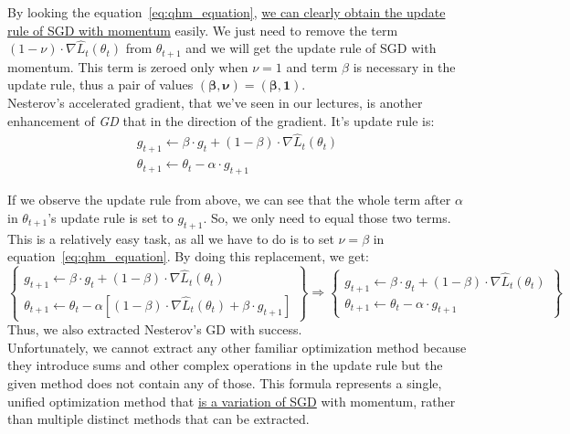 By looking the equation~\ref{eq:qhm_equation}, \underline{we can clearly obtain the update rule of SGD with momentum} easily. We just need to remove the term $\left(1 -\nu \right) \cdot \nabla \hat{L}_{t}\left(\theta_{t}\right)$ from $\theta_{t+1}$ and we will get the update rule of SGD with momentum.
This term is zeroed only when $\nu = 1$ and term $\beta$ is necessary in the update rule, thus a pair of values $\mathbf{\left(\beta, \nu\right) = \left(\beta, 1\right)}$.\\

Nesterov's accelerated gradient, that we've seen in our lectures, is another enhancement of \textit{GD} that  in the direction of the gradient. It's update rule is:
\[
\begin{array}{l}
	g_{t+1} \leftarrow \beta \cdot g_t + \left(1 - \beta \right) \cdot \nabla \hat{L}_t \left(\theta_t\right) \\ 
	\theta_{t+1} \leftarrow \theta_{t} - \alpha \cdot g_{t+1}
\end{array}
\]

If we observe the update rule from above, we can see that the whole term after $\alpha$ in $\theta_{t+1}$'s update rule is set to $g_{t+1}$. So, we only need to equal those two terms. This is a relatively easy task, as all we have to do is to set $\nu = \beta$ in equation~\ref{eq:qhm_equation}. By doing this replacement, we get:
\[
\left\{
\begin{array}{l}
	g_{t+1} \leftarrow \beta \cdot g_t + \left(1-\beta\right) \cdot \nabla \hat{L}_t \left(\theta_{t}\right) \\ 
	\theta_{t+1} \leftarrow \theta_{t} - \alpha \left[ \left(1-\beta\right) \cdot \nabla \hat{L}_t \left(\theta_{t}\right) + \beta \cdot g_{t+1} \right]
\end{array}
\right\} \Rightarrow
\left\{
\begin{array}{l}
	g_{t+1} \leftarrow \beta \cdot g_t + \left(1-\beta\right) \cdot \nabla \hat{L}_t \left(\theta_{t}\right) \\ 
	\theta_{t+1} \leftarrow \theta_{t} - \alpha \cdot g_{t+1}
\end{array}
\right\}
\]
Thus, we also extracted Nesterov's GD with success.\\

Unfortunately, we cannot extract any other familiar optimization method because they introduce sums and other complex operations in the update rule but the given method does not contain any of those. This formula represents a single, unified optimization method that \underline{is a variation of SGD} with momentum, rather than multiple distinct methods that can be extracted.
